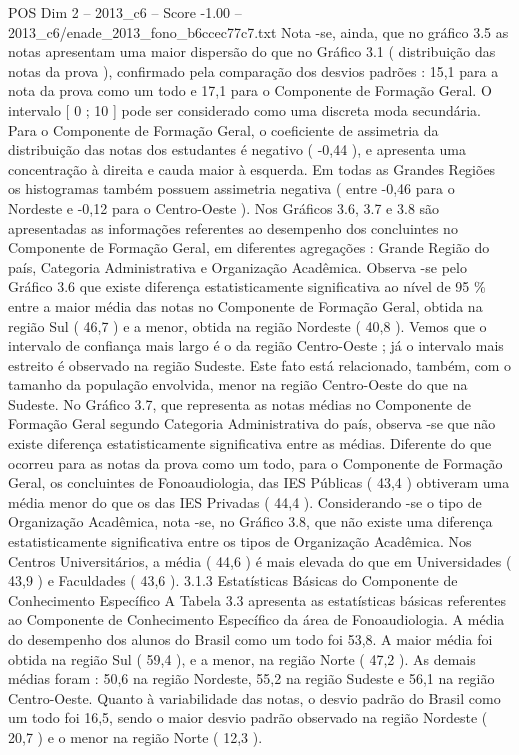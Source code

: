 \begin{textsample}{POS Dim 2 – 2013\_c6 – Score -1.00 – 2013\_c6/enade\_2013\_fono\_b6ccec77c7.txt}
Nota -se, ainda, que no gráfico 3.5 as notas apresentam uma maior dispersão do que no Gráfico 3.1 ( distribuição das notas da prova ), confirmado pela comparação dos desvios padrões : 15,1 para a nota da prova como um todo e 17,1 para o Componente de Formação Geral.
O intervalo [ 0 ; 10 ] pode ser considerado como uma discreta moda secundária.
Para o Componente de Formação Geral, o coeficiente de assimetria da distribuição das notas dos estudantes é negativo ( -0,44 ), e apresenta uma concentração à direita e cauda maior à esquerda.
Em todas as Grandes Regiões os histogramas também possuem assimetria negativa ( entre -0,46 para o Nordeste e -0,12 para o Centro-Oeste ).
Nos Gráficos 3.6, 3.7 e 3.8 são apresentadas as informações referentes ao desempenho dos concluintes no Componente de Formação Geral, em diferentes agregações : Grande Região do país, Categoria Administrativa e Organização Acadêmica.
Observa -se pelo Gráfico 3.6 que existe diferença estatisticamente significativa ao nível de 95 \% entre a maior média das notas no Componente de Formação Geral, obtida na região Sul ( 46,7 ) e a menor, obtida na região Nordeste ( 40,8 ).
Vemos que o intervalo de confiança mais largo é o da região Centro-Oeste ; já o intervalo mais estreito é observado na região Sudeste.
Este fato está relacionado, também, com o tamanho da população envolvida, menor na região Centro-Oeste do que na Sudeste.
No Gráfico 3.7, que representa as notas médias no Componente de Formação Geral segundo Categoria Administrativa do país, observa -se que não existe diferença estatisticamente significativa entre as médias.
Diferente do que ocorreu para as notas da prova como um todo, para o Componente de Formação Geral, os concluintes de Fonoaudiologia, das IES Públicas ( 43,4 ) obtiveram uma média menor do que os das IES Privadas ( 44,4 ).
Considerando -se o tipo de Organização Acadêmica, nota -se, no Gráfico 3.8, que não existe uma diferença estatisticamente significativa entre os tipos de Organização Acadêmica.
Nos Centros Universitários, a média ( 44,6 ) é mais elevada do que em Universidades ( 43,9 ) e Faculdades ( 43,6 ). 3.1.3 Estatísticas Básicas do Componente de Conhecimento Específico A Tabela 3.3 apresenta as estatísticas básicas referentes ao Componente de Conhecimento Específico da área de Fonoaudiologia.
A média do desempenho dos alunos do Brasil como um todo foi 53,8.
A maior média foi obtida na região Sul ( 59,4 ), e a menor, na região Norte ( 47,2 ).
As demais médias foram : 50,6 na região Nordeste, 55,2 na região Sudeste e 56,1 na região Centro-Oeste.
Quanto à variabilidade das notas, o desvio padrão do Brasil como um todo foi 16,5, sendo o maior desvio padrão observado na região Nordeste ( 20,7 ) e o menor na região Norte ( 12,3 ).

\end{textsample}
